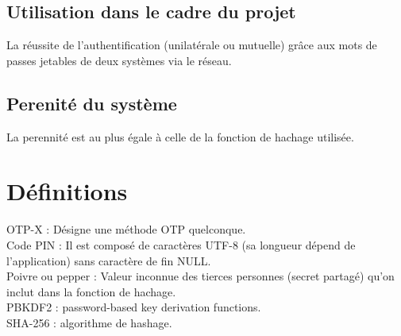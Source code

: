 \documentclass{article}
\begin{document}
  \subsection{Utilisation dans le cadre du projet}
  La réussite de l'authentification (unilatérale ou mutuelle) grâce aux mots de passes jetables de deux systèmes via le réseau.
  
  \subsection{Perenité du système}
  La perennité est au plus égale à celle de la fonction de hachage utilisée.

\section{Définitions}
OTP-X : Désigne une méthode OTP quelconque.\\
Code PIN : Il est composé de caractères UTF-8 (sa longueur dépend de l'application) sans caractère de fin NULL.\\
Poivre ou pepper : Valeur inconnue des tierces personnes (secret partagé) qu'on inclut dans la fonction de hachage.\\
PBKDF2 : password-based key derivation functions.\\
SHA-256 : algorithme de hashage.\\
\end{document}
